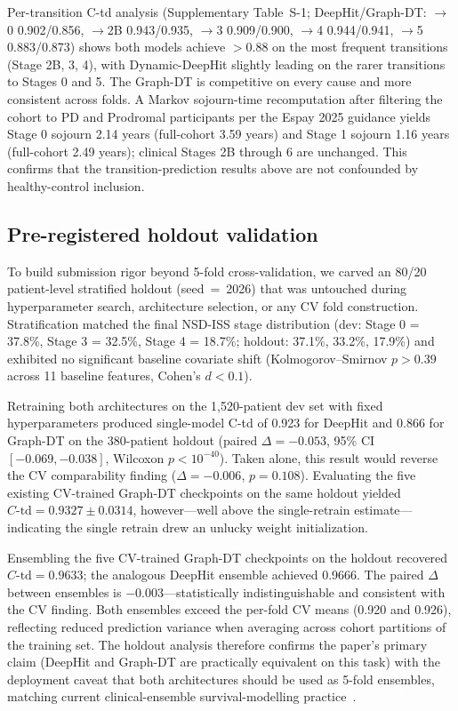 \documentclass[11pt]{article}
\begin{document}
Per-transition C-td analysis (Supplementary Table~S-1; DeepHit/Graph-DT: $\to$0 0.902/0.856, $\to$2B 0.943/0.935, $\to$3 0.909/0.900, $\to$4 0.944/0.941, $\to$5 0.883/0.873) shows both models achieve $>0.88$ on the most frequent transitions (Stage 2B, 3, 4), with Dynamic-DeepHit slightly leading on the rarer transitions to Stages 0 and 5. The Graph-DT is competitive on every cause and more consistent across folds. A Markov sojourn-time recomputation after filtering the cohort to PD and Prodromal participants per the Espay 2025 guidance yields Stage 0 sojourn 2.14 years (full-cohort 3.59 years) and Stage 1 sojourn 1.16 years (full-cohort 2.49 years); clinical Stages 2B through 6 are unchanged. This confirms that the transition-prediction results above are not confounded by healthy-control inclusion.

\subsection*{Pre-registered holdout validation}

To build submission rigor beyond 5-fold cross-validation, we carved an 80/20 patient-level stratified holdout (seed~=~2026) that was untouched during hyperparameter search, architecture selection, or any CV fold construction. Stratification matched the final NSD-ISS stage distribution (dev: Stage 0 = 37.8\%, Stage 3 = 32.5\%, Stage 4 = 18.7\%; holdout: 37.1\%, 33.2\%, 17.9\%) and exhibited no significant baseline covariate shift (Kolmogorov--Smirnov $p > 0.39$ across 11 baseline features, Cohen's $d < 0.1$).

Retraining both architectures on the 1{,}520-patient dev set with fixed hyperparameters produced single-model C-td of 0.923 for DeepHit and 0.866 for Graph-DT on the 380-patient holdout (paired $\Delta = -0.053$, 95\% CI $[-0.069, -0.038]$, Wilcoxon $p < 10^{-40}$). Taken alone, this result would reverse the CV comparability finding ($\Delta = -0.006$, $p = 0.108$). Evaluating the five existing CV-trained Graph-DT checkpoints on the same holdout yielded $C\text{-td} = 0.9327 \pm 0.0314$, however---well above the single-retrain estimate---indicating the single retrain drew an unlucky weight initialization.

Ensembling the five CV-trained Graph-DT checkpoints on the holdout recovered $C\text{-td} = 0.9633$; the analogous DeepHit ensemble achieved 0.9666. The paired $\Delta$ between ensembles is $-0.003$---statistically indistinguishable and consistent with the CV finding. Both ensembles exceed the per-fold CV means (0.920 and 0.926), reflecting reduced prediction variance when averaging across cohort partitions of the training set. The holdout analysis therefore confirms the paper's primary claim (DeepHit and Graph-DT are practically equivalent on this task) with the deployment caveat that both architectures should be used as 5-fold ensembles, matching current clinical-ensemble survival-modelling practice~\cite{shamsutdinova2024survcompare}.
\end{document}
